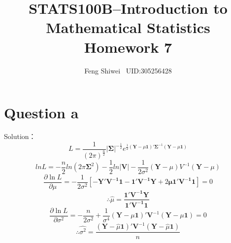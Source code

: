\documentclass[a4papers]{ctexart}
\title{STATS100B--Introduction to Mathematical Statistics \\Homework 7}
\author{Feng Shiwei \ UID:305256428}
\date{}
\begin{document}
\maketitle
\section*{Question a}
\noindent Solution：\\
\indent 
\[L=\dfrac{1}{(2\pi)^{\frac{n}{2}}}|\boldsymbol{\Sigma}|^{-\frac{1}{2}} 
    e^{\frac{1}{2}(\boldsymbol{\boldsymbol{\boldsymbol{Y}}}-\mu\boldsymbol{1})'\boldsymbol{\Sigma}^{-1}(\boldsymbol{\boldsymbol{Y}}-\mu\boldsymbol{1}) }
\]
\[lnL = -\dfrac{n}{2}ln(2\pi\boldsymbol{\Sigma}^2)-\dfrac{1}{2}ln|\boldsymbol{V}|-\dfrac{1}{2\sigma^2}(\boldsymbol{Y}-\mu)V^{-1}(\boldsymbol{Y}-\mu)
 \]
 \[\dfrac {\partial \ln L}{\partial \mu }=-\dfrac {1}{2\sigma ^{2}}\left[ -\boldsymbol{Y'V^{-1}1}-\boldsymbol{1'V^{-1}Y}+2\boldsymbol{\mu 1'V^{-1}1}\right] =0
     \]
\[ \therefore \hat{\mu} = \boldsymbol{ \dfrac{1'V^{-1}Y}{1'V^{-1}1} }\]
\[ \dfrac {\partial \ln L}{\partial \sigma ^{2}}=-\dfrac {n}{2\sigma ^{2}}+\dfrac {1}{\sigma ^{4}}\left( \boldsymbol{Y}-\mu \boldsymbol{1}\right)'\boldsymbol{V}^{-1}\left( \boldsymbol{Y}-\mu \boldsymbol{1}\right) =0\]
\[\therefore \hat{\sigma^2} =\dfrac{\left( \boldsymbol{Y}-\hat{\mu} \boldsymbol{1}\right) '\boldsymbol{V}^{-1}\left( \boldsymbol{Y}-\hat{\mu} \boldsymbol{1}\right)}{n} \]
\end{document}
